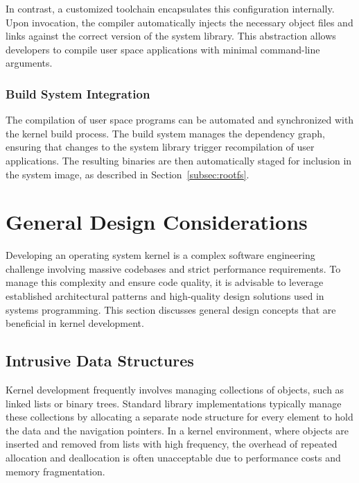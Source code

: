 \documentclass[a4paper,10pt,twoside]{report}
\theoremstyle{definition}
\begin{document}
In contrast, a customized toolchain encapsulates this configuration internally. Upon invocation, the compiler automatically injects the necessary object files and links against the correct version of the system library. This abstraction allows developers to compile user space applications with minimal command-line arguments.

\subsubsection{Build System Integration}

The compilation of user space programs can be automated and synchronized with the kernel build process. The build system manages the dependency graph, ensuring that changes to the system library trigger recompilation of user applications. The resulting binaries are then automatically staged for inclusion in the system image, as described in Section~\ref{subsec:rootfs}.


\section{General Design Considerations}

Developing an operating system kernel is a complex software engineering challenge involving massive codebases and strict performance requirements. To manage this complexity and ensure code quality, it is advisable to leverage established architectural patterns and high-quality design solutions used in systems programming. This section discusses general design concepts that are beneficial in kernel development.

\subsection{Intrusive Data Structures}
\label{subsec:intrusive}

Kernel development frequently involves managing collections of objects, such as linked lists or binary trees. Standard library implementations typically manage these collections by allocating a separate node structure for every element to hold the data and the navigation pointers. In a kernel environment, where objects are inserted and removed from lists with high frequency, the overhead of repeated allocation and deallocation is often unacceptable due to performance costs and memory fragmentation.
\end{document}
